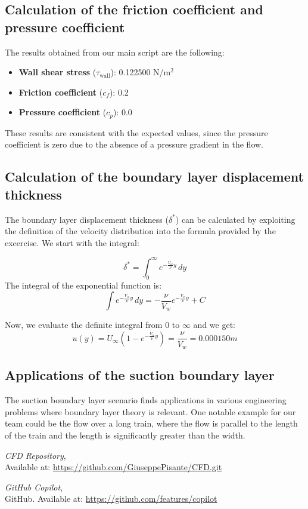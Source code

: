 \documentclass{article}
\begin{document}
\subsection{Calculation of the friction coefficient and pressure coefficient}
The results obtained from our main script are the following:
\begin{itemize}
    \item \textbf{Wall shear stress} (\(\tau_{\text{wall}}\)): 0.122500 N/m\(^2\)
    \item \textbf{Friction coefficient} (\(c_f\)): 0.2
    \item \textbf{Pressure coefficient} (\(c_p\)): 0.0
\end{itemize}
These results are consistent with the expected values, since the pressure coefficient is zero due to the absence of a pressure gradient in the flow.

\subsection{Calculation of the boundary layer displacement thickness}
The boundary layer displacement thickness (\(\delta^*\)) can be calculated by exploiting the definition of the velocity distribution into the formula provided by the excercise.
We start with the integral:

\[
\delta^* = \int_0^\infty e^{-\frac{V_w}{\nu} y} \, dy
\]
The integral of the exponential function is:
\[
\int e^{-\frac{V_w}{\nu} y} \, dy = -\frac{\nu}{V_w} e^{-\frac{V_w}{\nu} y} + C
\]

Now, we evaluate the definite integral from \(0\) to \(\infty\) and we get:
\[
u(y) = U_\infty \left(1 - e^{-\frac{V_w}{\nu} y}\right) = \frac{\nu}{V_w} = 0.000150 m
\]

\subsection{Applications of the suction boundary layer}
The suction boundary layer scenario finds applications in various engineering problems where boundary layer theory is relevant. One notable example for our team could be the flow over a long train, where the flow is parallel to the length of the train and the length is significantly greater than the width. 

\begin{thebibliography}{9}
    \textit{CFD Repository},\\
    Available at: \url{https://github.com/GiuseppePisante/CFD.git}
    
    \textit{GitHub Copilot},\\
    GitHub. Available at: \url{https://github.com/features/copilot}
    \end{thebibliography}
\end{document}
